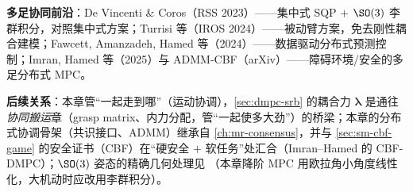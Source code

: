 \textbf{多足协同前沿}：De Vincenti \& Coros（RSS 2023\cite{devincenti2023centralized}）——集中式 SQP $+$ $\SO(3)$ 李群积分，对照集中式方案；Turrisi 等（IROS 2024\cite{turrisi2024pacc}）——被动臂方案，免去刚性耦合建模；Fawcett, Amanzadeh, Hamed 等（2024\cite{fawcett2024datadriven}）——数据驱动分布式预测控制；Imran, Hamed 等（2025\cite{imran2025obstacle}）与 ADMM-CBF（arXiv\cite{zeng2026admmcbf}）——障碍环境/安全的多足分布式 MPC。

\textbf{后续关系}：本章管“一起走到哪”（运动协调），\cref{sec:dmpc-srb} 的耦合力 $\boldsymbol{\lambda}$ 是通往\emph{协同搬运}章（grasp matrix、内力分配，管“一起使多大劲”）的桥梁；本章的分布式协调骨架（共识接口、ADMM）继承自 \cref{ch:mr-consensus}，并与 \cref{sec:sm-cbf-game} 的安全证书（CBF）在“硬安全 $+$ 软任务”处汇合（Imran--Hamed\cite{imran2025obstacle} 的 CBF-DMPC）；$\SO(3)$ 姿态的精确几何处理见 （本章降阶 MPC 用欧拉角小角度线性化，大机动时应改用李群积分）。
